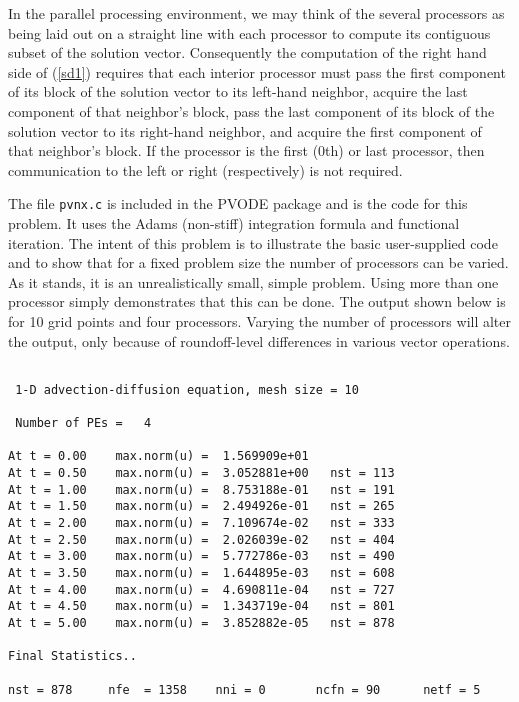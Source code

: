 In the parallel processing environment, we may think of
the several processors as being laid out on a straight line with each
processor to compute its contiguous subset of the solution vector.
Consequently the computation of the right hand side of (\ref{sd1}) requires
that each interior processor must pass the first component of its block of
the solution vector to its left-hand neighbor, acquire the last component of
that neighbor's block, pass the last component of its block of the solution
vector to its right-hand neighbor, and acquire the first component of that
neighbor's block. If the processor is the first ($0$th) or last processor,
then communication to the left or right (respectively) is not required.

The file {\tt pvnx.c} is included in the PVODE package and is the code for
this problem. It uses the Adams (non-stiff) integration formula and
functional iteration. The intent of this problem is to illustrate the basic
user-supplied code and to show that for a fixed problem size the number
of processors can be varied. As it stands, it is an unrealistically small,
simple problem. Using more than one processor simply demonstrates that this
can be done. The output shown below is for 10 grid points and four
processors. Varying the number of processors will alter the output,
only because of roundoff-level differences in various vector operations.

\begin{verbatim}

 1-D advection-diffusion equation, mesh size = 10 

 Number of PEs =   4 

At t = 0.00    max.norm(u) =  1.569909e+01 
At t = 0.50    max.norm(u) =  3.052881e+00   nst = 113 
At t = 1.00    max.norm(u) =  8.753188e-01   nst = 191 
At t = 1.50    max.norm(u) =  2.494926e-01   nst = 265 
At t = 2.00    max.norm(u) =  7.109674e-02   nst = 333 
At t = 2.50    max.norm(u) =  2.026039e-02   nst = 404 
At t = 3.00    max.norm(u) =  5.772786e-03   nst = 490 
At t = 3.50    max.norm(u) =  1.644895e-03   nst = 608 
At t = 4.00    max.norm(u) =  4.690811e-04   nst = 727 
At t = 4.50    max.norm(u) =  1.343719e-04   nst = 801 
At t = 5.00    max.norm(u) =  3.852882e-05   nst = 878 

Final Statistics.. 

nst = 878     nfe  = 1358    nni = 0       ncfn = 90      netf = 5
 
\end{verbatim}

